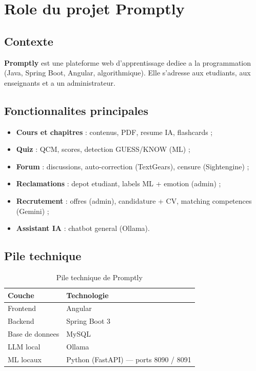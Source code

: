 \chapter{Role du projet Promptly}
\label{ch:role}

\section{Contexte}

\textbf{Promptly} est une plateforme web d'apprentissage dediee a la programmation
(Java, Spring Boot, Angular, algorithmique). Elle s'adresse aux etudiants, aux
enseignants et a un administrateur.

\section{Fonctionnalites principales}

\begin{itemize}
  \item \textbf{Cours et chapitres} : contenus, PDF, resume IA, flashcards ;
  \item \textbf{Quiz} : QCM, scores, detection GUESS/KNOW (ML) ;
  \item \textbf{Forum} : discussions, auto-correction (TextGears), censure (Sightengine) ;
  \item \textbf{Reclamations} : depot etudiant, labels ML + emotion (admin) ;
  \item \textbf{Recrutement} : offres (admin), candidature + CV, matching competences (Gemini) ;
  \item \textbf{Assistant IA} : chatbot general (Ollama).
\end{itemize}

\section{Pile technique}

\begin{table}[H]
\centering
\begin{tabular}{@{}ll@{}}
\toprule
Couche & Technologie \\
\midrule
Frontend & Angular \\
Backend & Spring Boot 3 \\
Base de donnees & MySQL \\
LLM local & Ollama \\
ML locaux & Python (FastAPI) --- ports 8090 / 8091 \\
\bottomrule
\end{tabular}
\caption{Pile technique de Promptly}
\end{table}

